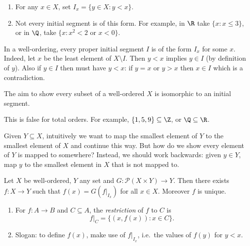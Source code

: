 \documentclass[a4paper]{article}
\begin{document}
\begin{eg}\leavevmode
  \begin{enumerate}
  \item For any \(x \in X\), set \(I_x = \{y \in X: y < x\}\).
  \item Not every initial segment is of this form. For example, in \(\R\) take \(\{x: x \leq 3\}\), or in \(\Q\), take \(\{x: x^2 < 2 \text{ or } x < 0\}\).
  \end{enumerate}
\end{eg}

\begin{note}
  In a well-ordering, every proper initial segment \(I\) is of the form \(I_x\) for some \(x\). Indeed, let \(x\) be the least element of \(X \setminus I\). Then \(y < x\) implies \(y \in I\) (by definition of \(y\)). Also if \(y \in I\) then must have \(y < x\): if \(y = x\) or \(y > x\) then \(x \in I\) which is a contradiction.
\end{note}

The aim to show every subset of a well-ordered \(X\) is isomorphic to an initial segment.

\begin{note}
  This is false for total orders. For example, \(\{1, 5, 9\} \subseteq \Z\), or \(\Q \subseteq \R\).
\end{note}

Given \(Y \subseteq X\), intuitively we want to map the smallest element of \(Y\) to the smallest element of \(X\) and continue this way. But how do we show every element of \(Y\) is mapped to somewhere? Instead, we should work backwards: given  \(y \in Y\), map \(y\) to the smallest element in \(X\) that is not mapped to.

\begin{theorem}
  Let \(X\) be well-ordered, \(Y\) any set and \(G: \mathcal P(X \times Y) \to Y\). Then there exists \(f: X \to Y\) such that \(f(x) = G(f|_{I_x})\) for all \(x \in X\). Moreover \(f\) is unique.
\end{theorem}

\begin{note}\leavevmode
  \begin{enumerate}
  \item For \(f: A \to B\) and \(C \subseteq A\), the \emph{restriction} of \(f\) to \(C\) is
    \[
      f|_C = \{(x, f(x)): x \in C\}.
    \]
  \item Slogan: to define \(f(x)\), make use of \(f|_{I_x}\), i.e.\ the values of \(f(y)\) for \(y < x\).
  \end{enumerate}
\end{note}
\end{document}
